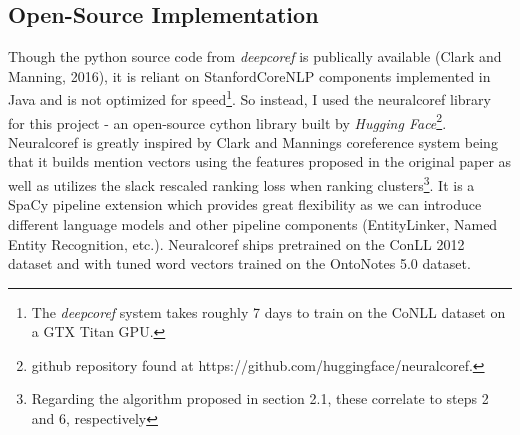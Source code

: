 \documentclass[11pt]{article}
\begin{document}
\subsection{Open-Source Implementation}
Though the python source code from \textit{deepcoref} is publically available (Clark and Manning, 2016), it is reliant on StanfordCoreNLP components implemented in Java and is not optimized for speed\footnote{The \textit{deepcoref} system takes roughly 7 days to train on the CoNLL dataset on a GTX Titan GPU.}. So instead, I used the neuralcoref library for this project - an open-source cython library built by \textit{Hugging Face}\footnote{github repository found at https://github.com/huggingface/neuralcoref.}. Neuralcoref is greatly inspired by Clark and Mannings coreference system being that it builds mention vectors using the features proposed in the original paper as well as utilizes the slack rescaled ranking loss when ranking clusters\footnote{Regarding the algorithm proposed in section 2.1, these correlate to steps 2 and 6, respectively}. It is a SpaCy pipeline extension which provides great flexibility as we can introduce different language models and other pipeline components (EntityLinker, Named Entity Recognition, etc.). Neuralcoref ships pretrained on the ConLL 2012 dataset and with tuned word vectors trained on the OntoNotes 5.0 dataset. \\
\end{document}
